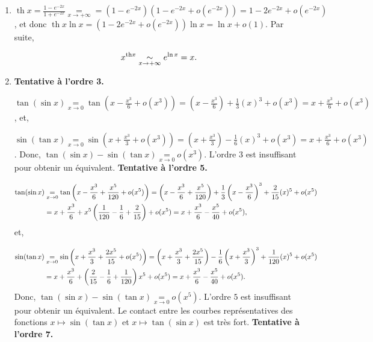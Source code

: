 \documentclass[11pt,a4paper]{article}
\renewcommand{\tanh}{\mathop{\mathrm{th}}\nolimits}
\begin{document}
\begin{enumerate}
\begin{center}
\end{center}
 \item  $\tanh x=\frac{1-e^{-2x}}{1+e^{-2x}}\underset{x\rightarrow+\infty}{=}=(1-e^{-2x})(1-e^{-2x}+o(e^{-2x}))=1-2e^{-2x}+o(e^{-2x})$, et donc $\tanh x\ln x=(1-2e^{-2x}+o(e^{-2x}))\ln x=\ln x+o(1)$. Par suite,

$$x^{\mbox{\scriptsize{th}}x}\underset{x\rightarrow+\infty}{\sim}e^{\ln x}=x.$$
 \item  \textbf{Tentative à l'ordre 3.}

$\tan(\sin x)\underset{x\rightarrow0}{=}\tan\left(x-\frac{x^3}{6}+o(x^3)\right)=\left(x-\frac{x^3}{6}\right)+\frac{1}{3}(x)^3+o(x^3)=x+\frac{x^3}{6}+o(x^3)$, et,

$\sin(\tan x)\underset{x\rightarrow0}{=}\sin\left(x+\frac{x^3}{3}+o(x^3)\right)=\left(x+\frac{x^3}{3}\right)-\frac{1}{6}(x)^3+o(x^3)=x+\frac{x^3}{6}+o(x^3)$.
Donc, $\tan(\sin x)-\sin(\tan x)\underset{x\rightarrow0}{=}o(x^3)$. L'ordre $3$ est insuffisant pour obtenir un équivalent.
\textbf{Tentative à l'ordre 5.}

\begin{align*}\ensuremath
\tan(\sin x)&\underset{x\rightarrow0}{=}\tan\left(x-\frac{x^3}{6}+\frac{x^5}{120}+o(x^5)\right)
=\left(x-\frac{x^3}{6}+\frac{x^5}{120}\right)+\frac{1}{3}\left(x-\frac{x^3}{6}\right)^3+\frac{2}{15}(x)^5+o(x^5)\\
 &=x+\frac{x^3}{6}+x^5\left(\frac{1}{120}-\frac{1}{6}+\frac{2}{15}\right)+o(x^5)=x+\frac{x^3}{6}-\frac{x^5}{40}+o(x^5),
\end{align*}
et,

\begin{align*}\ensuremath
\sin(\tan x)&\underset{x\rightarrow0}{=}\sin\left(x+\frac{x^3}{3}+\frac{2x^5}{15}+o(x^5)\right)
=\left(x+\frac{x^3}{3}+\frac{2x^5}{15}\right)-\frac{1}{6}\left(x+\frac{x^3}{3}\right)^3+\frac{1}{120}(x)^5+o(x^5)\\
 &=x+\frac{x^3}{6}+\left(\frac{2}{15}-\frac{1}{6}+\frac{1}{120}\right)x^5+o(x^5)=x+\frac{x^3}{6}-\frac{x^5}{40}+o(x^5).
\end{align*}
Donc, $\tan(\sin x)-\sin(\tan x)\underset{x\rightarrow0}{=}o(x^5)$. L'ordre $5$ est insuffisant pour obtenir un équivalent. Le contact entre les courbes représentatives des fonctions $x\mapsto\sin(\tan x)$ et $x\mapsto\tan(\sin x)$ est très fort.
\textbf{Tentative à l'ordre 7.}


\end{enumerate}
\end{document}
